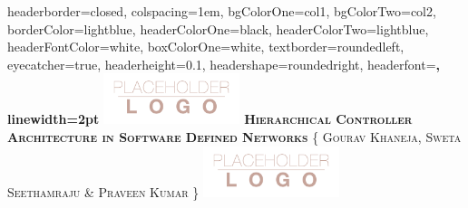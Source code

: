\documentclass[portrait,a1paper,fontscale=0.5]{baposter} %
\begin{document}
\begin{poster}
{
headerborder=closed, %
colspacing=1em, %
bgColorOne=col1,
bgColorTwo=col2,
borderColor=lightblue, %
headerColorOne=black, %
headerColorTwo=lightblue, %
headerFontColor=white, %
boxColorOne=white, %
textborder=roundedleft, %
eyecatcher=true, %
headerheight=0.1\textheight, %
headershape=roundedright, %
headerfont=\Large\bf\textsc, %
linewidth=2pt %
}
%
{\includegraphics[height=4em]{logo.png}} %
{\bf\textsc{Hierarchical Controller Architecture in Software Defined Networks}\vspace{0.5em}} %
{\textsc{\{ Gourav Khaneja, Sweta Seethamraju \& Praveen Kumar \} \hspace{12pt}}} %
{\includegraphics[height=4em]{logo.png}} %



\end{poster}
\end{document}
